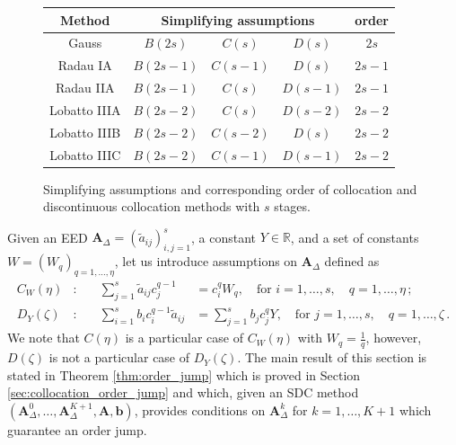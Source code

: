 \documentclass[sn-mathphys-num]{sn-jnl}%
\newcommand{\reva}[1]{#1}%
\theoremstyle{thmstyleone}%
\theoremstyle{thmstyletwo}%
\theoremstyle{thmstylethree}%
\begin{document}
\renewcommand{\figurename}{Table}
\begin{figure}
    \centering
    \begin{tabular}{ | c || c c c | c | }
        \hline
        Method & \multicolumn{3}{c|}{Simplifying assumptions} & order \\
        \hline
        \hline
        Gauss & $B(2s)$ & $C(s)$ & $D(s)$  & $2s$ \\
        Radau IA & $B(2s - 1)$ & $C(s - 1)$ & $D(s)$  & $2s - 1$ \\
        Radau IIA & $B(2s - 1)$ & $C(s)$ & $D(s - 1)$  & $2s - 1$ \\
        Lobatto IIIA & $B(2s - 2)$ & $C(s)$ & $D(s - 2)$  & $2s - 2$ \\
        Lobatto IIIB & $B(2s - 2)$ & $C(s - 2)$ & $D(s)$  & $2s - 2$ \\
        Lobatto IIIC & $B(2s - 2)$ & $C(s - 1)$ & $D(s - 1)$  & $2s - 2$ \\
        \hline
    \end{tabular}
    \caption{Simplifying assumptions and corresponding order of collocation \reva{and discontinuous collocation} methods with $s$ stages.}
    \label{fig:simplifying_assumptions}
\end{figure}
\renewcommand{\figurename}{Fig.}
Given an EED $\bm{A}_\Delta = (\tilde{a}_{ij})_{i,j=1}^s$, \reva{a constant $Y \in \mathbb{R}$, and a set of constants $W = (W_q)_{q=1,\dots,\eta}$, let us introduce assumptions on $\bm{A}_\Delta$ defined as} 
\begin{align*}
    C_W(\eta) &:&\quad \sum_{j=1}^s \tilde{a}_{ij} c_j^{q-1} &= c_i^q W_q, \quad \text{for } i = 1, \dots, s, \quad q = 1, \dots, \eta \,; \\
    D_Y(\zeta) &:&\quad \sum_{i=1}^s b_i c_i^{q-1} \tilde{a}_{ij} &= \sum_{j=1}^s b_j c_j^q Y, \quad \text{for } j = 1, \dots, s, \quad q = 1, \dots, \zeta \,.
\end{align*}
We note that $C(\eta)$ is a particular case of $C_W(\eta)$ \reva{with $W_q = \frac1q$}, however, $D(\zeta)$ is not a particular case of $D_Y(\zeta)$.
The main result of this section is stated in Theorem \ref{thm:order_jump} which is proved in Section \ref{sec:collocation_order_jump} \reva{and which, given an SDC method $(\bm{A}^0_\Delta, \dots, \bm{A}^{K+1}_\Delta, \bm{A}, \bm{b})$, provides conditions on $\bm{A}^k_\Delta$ for $k=1,\dots,K+1$ which guarantee an order jump.}
\end{document}
